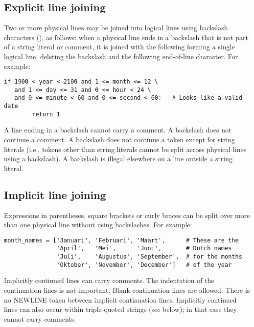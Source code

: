 \subsection{Explicit line joining\label{explicit-joining}}

Two or more physical lines may be joined into logical lines using
backslash characters (\code{\e}), as follows: when a physical line ends
in a backslash that is not part of a string literal or comment, it is
joined with the following forming a single logical line, deleting the
backslash and the following end-of-line character.  For example:
%
\begin{verbatim}
if 1900 < year < 2100 and 1 <= month <= 12 \
   and 1 <= day <= 31 and 0 <= hour < 24 \
   and 0 <= minute < 60 and 0 <= second < 60:   # Looks like a valid date
        return 1
\end{verbatim}

A line ending in a backslash cannot carry a comment.  A backslash does
not continue a comment.  A backslash does not continue a token except
for string literals (i.e., tokens other than string literals cannot be
split across physical lines using a backslash).  A backslash is
illegal elsewhere on a line outside a string literal.


\subsection{Implicit line joining\label{implicit-joining}}

Expressions in parentheses, square brackets or curly braces can be
split over more than one physical line without using backslashes.
For example:

\begin{verbatim}
month_names = ['Januari', 'Februari', 'Maart',      # These are the
               'April',   'Mei',      'Juni',       # Dutch names
               'Juli',    'Augustus', 'September',  # for the months
               'Oktober', 'November', 'December']   # of the year
\end{verbatim}

Implicitly continued lines can carry comments.  The indentation of the
continuation lines is not important.  Blank continuation lines are
allowed.  There is no NEWLINE token between implicit continuation
lines.  Implicitly continued lines can also occur within triple-quoted
strings (see below); in that case they cannot carry comments.


